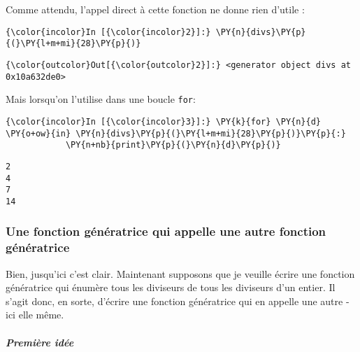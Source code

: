     Comme attendu, l'appel direct à cette fonction ne donne rien d'utile :

    \begin{Verbatim}[commandchars=\\\{\},frame=single,framerule=0.3mm,rulecolor=\color{cellframecolor}]
{\color{incolor}In [{\color{incolor}2}]:} \PY{n}{divs}\PY{p}{(}\PY{l+m+mi}{28}\PY{p}{)}
\end{Verbatim}


\begin{Verbatim}[commandchars=\\\{\},frame=single,framerule=0.3mm,rulecolor=\color{cellframecolor}]
{\color{outcolor}Out[{\color{outcolor}2}]:} <generator object divs at 0x10a632de0>
\end{Verbatim}
            
    Mais lorsqu'on l'utilise dans une boucle \texttt{for}:

    \begin{Verbatim}[commandchars=\\\{\},frame=single,framerule=0.3mm,rulecolor=\color{cellframecolor}]
{\color{incolor}In [{\color{incolor}3}]:} \PY{k}{for} \PY{n}{d} \PY{o+ow}{in} \PY{n}{divs}\PY{p}{(}\PY{l+m+mi}{28}\PY{p}{)}\PY{p}{:}
            \PY{n+nb}{print}\PY{p}{(}\PY{n}{d}\PY{p}{)}
\end{Verbatim}


    \begin{Verbatim}[commandchars=\\\{\},frame=single,framerule=0.3mm,rulecolor=\color{cellframecolor}]
2
4
7
14
\end{Verbatim}

    \hypertarget{une-fonction-guxe9nuxe9ratrice-qui-appelle-une-autre-fonction-guxe9nuxe9ratrice}{%
\subsubsection{Une fonction génératrice qui appelle une autre fonction
génératrice}\label{une-fonction-guxe9nuxe9ratrice-qui-appelle-une-autre-fonction-guxe9nuxe9ratrice}}

    Bien, jusqu'ici c'est clair. Maintenant supposons que je veuille écrire
une fonction génératrice qui énumère tous les diviseurs de tous les
diviseurs d'un entier. Il s'agit donc, en sorte, d'écrire une fonction
génératrice qui en appelle une autre - ici elle même.

    \hypertarget{premiuxe8re-iduxe9e}{%
\subparagraph{Première idée}\label{premiuxe8re-iduxe9e}}

